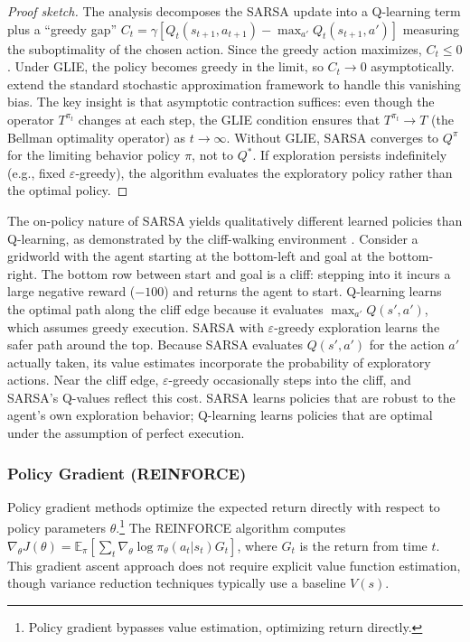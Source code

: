 \begin{proof}[Proof sketch]
The analysis decomposes the SARSA update into a Q-learning term plus a ``greedy gap'' $C_t = \gamma[Q_t(s_{t+1}, a_{t+1}) - \max_{a'} Q_t(s_{t+1}, a')]$ measuring the suboptimality of the chosen action. Since the greedy action maximizes, $C_t \leq 0$. Under GLIE, the policy becomes greedy in the limit, so $C_t \to 0$ asymptotically. \citet{singh2000} extend the standard stochastic approximation framework to handle this vanishing bias. The key insight is that asymptotic contraction suffices: even though the operator $T^{\pi_t}$ changes at each step, the GLIE condition ensures that $T^{\pi_t} \to T$ (the Bellman optimality operator) as $t \to \infty$. Without GLIE, SARSA converges to $Q^\pi$ for the limiting behavior policy $\pi$, not to $Q^*$. If exploration persists indefinitely (e.g., fixed $\varepsilon$-greedy), the algorithm evaluates the exploratory policy rather than the optimal policy.
\end{proof}

The on-policy nature of SARSA yields qualitatively different learned policies than Q-learning, as demonstrated by the cliff-walking environment \citep{sutton2018}. Consider a gridworld with the agent starting at the bottom-left and goal at the bottom-right. The bottom row between start and goal is a cliff: stepping into it incurs a large negative reward ($-100$) and returns the agent to start. Q-learning learns the optimal path along the cliff edge because it evaluates $\max_{a'} Q(s', a')$, which assumes greedy execution. SARSA with $\varepsilon$-greedy exploration learns the safer path around the top. Because SARSA evaluates $Q(s', a')$ for the action $a'$ actually taken, its value estimates incorporate the probability of exploratory actions. Near the cliff edge, $\varepsilon$-greedy occasionally steps into the cliff, and SARSA's Q-values reflect this cost. SARSA learns policies that are robust to the agent's own exploration behavior; Q-learning learns policies that are optimal under the assumption of perfect execution.

\subsubsection{Policy Gradient (REINFORCE)}

Policy gradient methods optimize the expected return directly with respect to policy parameters $\theta$.\footnote{Policy gradient bypasses value estimation, optimizing return directly.} The REINFORCE algorithm computes $\nabla_\theta J(\theta) = \mathbb{E}_\pi[\sum_t \nabla_\theta \log \pi_\theta(a_t|s_t) G_t]$, where $G_t$ is the return from time $t$. This gradient ascent approach does not require explicit value function estimation, though variance reduction techniques typically use a baseline $V(s)$.

